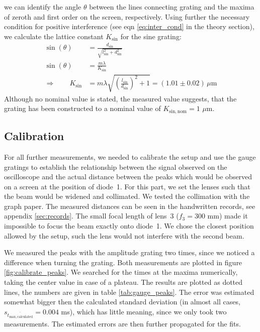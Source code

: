 we can identify the angle $\theta$ between the lines connecting grating and the maxima 
of zeroth and first order on the screen, respectively. Using further the 
necessary condition for positive interference (see eqn \eqref{eq:inter_cond} in the theory section), 
we calculate the lattice constant $K_\mathrm{sin}$ for the sine grating:
\begin{align}
    \sin(\theta)&= \frac{d_\mathrm{sin}}{\sqrt{l_\mathrm{sin}^2 + d_\mathrm{sin}^2}} \\
    \sin(\theta)&= \frac{m\lambda}{K_\mathrm{sin}} \\
    \Rightarrow \qquad 
    K_\mathrm{sin}    &= m \lambda\sqrt{\left(\frac{l_\mathrm{sin}}{d_\mathrm{sin}}\right)^2 + 1} 
        = (1.01 \pm 0.02) \, \mu\mathrm{m}
\end{align}
Although no nominal value is stated, the measured value suggests, that the grating has been 
constructed to a nominal value of $K_\mathrm{sin, nom} = 1$ $\mu$m. 

\subsection{Calibration}
For all further measurements, we needed to calibrate the setup and use the gauge gratings 
to establish the relationship between the signal observed on the oscilloscope and the 
actual distance between the peaks which would be observed on a screen at the position of diode~1. 
For this part, we set the lenses such that the beam would be widened and collimated. We tested the collimation 
with the graph paper. The measured distances can be seen in the handwritten records, see appendix \ref{sec:records}.
The small focal length of lens~3 ($f_3 = 300$ mm) made it impossible to focus the beam exactly onto diode~1. We 
chose the closest position allowed by the setup, such the lens would not interfere with the second beam. 

We measured the peaks with the amplitude grating two times, since we noticed a difference when turning the grating. 
Both measurements are plotted in figure \ref{fig:calibrate_peaks}. 
We searched for the times at the maxima numerically, taking the center value in case of a plateau. 
The results are plotted as dotted lines, the numbers are given in table \ref{tab:gauge_peaks}. 
The error was estimated somewhat bigger then the calculated standard deviation (in almost 
    all cases, $s_{\overline{t_\mathrm{max, calculated}}}  = 0.004$ ms), which has little meaning, 
since we only took two measurements. The estimated errors are then further propagated for the fits. 

